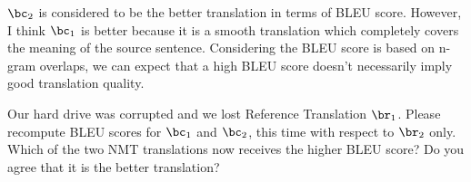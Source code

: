 \begin{parts}
\begin{subparts}
{            $\bc_2$ is considered to be the better translation in terms of BLEU score. However, I think $\bc_1$ is better because it is a smooth translation which completely covers the meaning of the source sentence. Considering the BLEU score is based on n-gram overlaps, we can expect that a high BLEU score doesn't necessarily imply good translation quality. 
        }
        
        
        \subpart[5] Our hard drive was corrupted and we lost Reference Translation $\br_1$. Please recompute BLEU scores for $\bc_1$ and $\bc_2$, this time with respect to $\br_2$ only. Which of the two NMT translations now receives the higher BLEU score? Do you agree that it is the better translation?
        
\end{subparts}
\end{parts}
